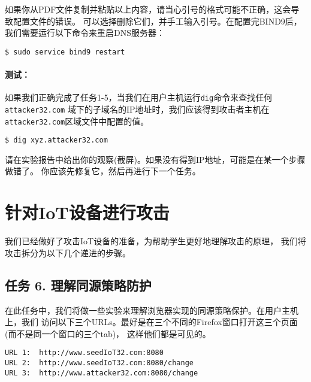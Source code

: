 如果你从PDF文件复制并粘贴以上内容，请当心引号的格式可能不正确，这会导致配置文件的错误。
可以选择删除它们，并手工输入引号。在配置完BIND9后，我们需要运行以下命令来重启DNS服务器：


\begin{lstlisting}
$ sudo service bind9 restart
\end{lstlisting}



\paragraph{测试：}
如果我们正确完成了任务1-5，当我们在用户主机运行\texttt{dig}命令来查找任何 \texttt{attacker32.com}
域下的子域名的IP地址时，我们应该得到攻击者主机在\texttt{attacker32.com}区域文件中配置的值。


\begin{lstlisting}
$ dig xyz.attacker32.com
\end{lstlisting}
 


请在实验报告中给出你的观察(截屏)。如果没有得到IP地址，可能是在某一个步骤做错了。
你应该先修复它，然后再进行下一个任务。




\section{针对IoT设备进行攻击}

我们已经做好了攻击IoT设备的准备，为帮助学生更好地理解攻击的原理，
我们将攻击拆分为以下几个递进的步骤。


\subsection{任务 6. 理解同源策略防护}

在此任务中，我们将做一些实验来理解浏览器实现的同源策略保护。在用户主机上，我们
访问以下三个URLs。最好是在三个不同的Firefox窗口打开这三个页面(而不是同一个窗口的三个tab)，
这样他们都是可见的。


\begin{lstlisting}
URL 1:  http://www.seedIoT32.com:8080
URL 2:  http://www.seedIoT32.com:8080/change
URL 3:  http://www.attacker32.com:8080/change
\end{lstlisting}


